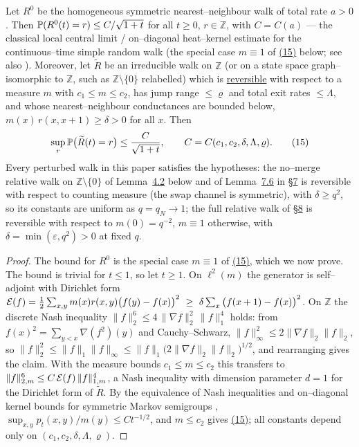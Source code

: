 \documentclass[11pt]{article}
\theoremstyle{plain}
\theoremstyle{definition}
\theoremstyle{remark}
\newcommand{\Z}{\mathbb{Z}}\newcommand{\R}{\mathbb{R}}\newcommand{\N}{\mathbb{N}}
\newcommand{\eps}{\varepsilon}\newcommand{\Exp}{\mathrm{Exp}}
\begin{document}
Let $R^0$ be the homogeneous symmetric nearest--neighbour walk of total rate $a>0$.
Then $\mathbb{P}(R^0(t)=r)\le C/\sqrt{1+t}$ for all $t\ge0$, $r\in\Z$, with $C=C(a)$ --- the
classical local central limit / on--diagonal heat--kernel estimate for the
continuous--time simple random walk (the special case $m\equiv1$ of \hyperref[eq_tildeR]{(15)}
below; see also \cite{LawlerLimic}).
Moreover, let $\widetilde R$ be an irreducible walk on $\Z$ (or on a state space
graph--isomorphic to $\Z$, such as $\Z\setminus\{0\}$ relabelled) which is
\underline{reversible} with respect to a measure $m$ with $c_1\le m\le c_2$, has jump range
$\le\varrho$ and total exit rates $\le\Lambda$, and whose nearest--neighbour
conductances are bounded below, $m(x)\,r(x,x+1)\ge\delta>0$ for all $x$. Then
\label{eq_tildeR}
\begin{equation}
  \sup_{r}\mathbb{P}\big(\widetilde R(t)=r\big)\le \frac{C}{\sqrt{1+t}},
  \qquad C=C(c_1,c_2,\delta,\Lambda,\varrho).\qquad(15)
\end{equation}
Every perturbed walk in this paper satisfies the hypotheses: the no--merge relative
walk on $\Z\setminus\{0\}$ of Lemma~\hyperref[lem_Rlclt]{4.2} below and of Lemma~\hyperref[lem_occ]{7.6} in \S\hyperref[sec_cross]{7} is reversible
with respect to counting measure (the swap channel is symmetric), with $\delta\ge
q^2$, so its constants are uniform as $q=q_N\to1$; the full relative walk of
\S\hyperref[sec_tw]{8} is reversible with respect to $m(0)=q^{-2}$, $m\equiv1$ otherwise, with
$\delta=\min(\eps,q^2)>0$ at fixed $q$.
\par
\begin{proof}
The bound for $R^0$ is the special case $m\equiv1$ of \hyperref[eq_tildeR]{(15)}, which we now
prove. The bound is trivial for $t\le1$, so let $t\ge1$. On $\ell^2(m)$
the generator is self--adjoint with Dirichlet form
$\mathcal E(f)=\tfrac12\sum_{x,y}m(x)r(x,y)\big(f(y)-f(x)\big)^2
\ \ge\ \delta\sum_x\big(f(x+1)-f(x)\big)^2$. On $\Z$ the discrete Nash inequality
$\|f\|_2^6\le4\,\|\nabla f\|_2^2\,\|f\|_1^4$ holds: from
$f(x)^2=\sum_{y<x}\nabla(f^2)(y)$ and Cauchy--Schwarz,
$\|f\|_\infty^2\le2\|\nabla f\|_2\|f\|_2$, so
$\|f\|_2^2\le\|f\|_1\|f\|_\infty\le\|f\|_1\big(2\|\nabla f\|_2\|f\|_2\big)^{1/2}$,
and rearranging gives the claim. With the measure bounds $c_1\le m\le c_2$ this
transfers to $\|f\|_{2,m}^6\le C\,\mathcal E(f)\,\|f\|_{1,m}^4$, a Nash inequality with
dimension parameter $d=1$ for the Dirichlet form of $\widetilde R$. By the
equivalence of Nash inequalities and on--diagonal kernel bounds for symmetric Markov
semigroups \cite{CKS}, $\sup_{x,y}p_t(x,y)/m(y)\le Ct^{-1/2}$, and $m\le c_2$ gives
\hyperref[eq_tildeR]{(15)}; all constants depend only on $(c_1,c_2,\delta,\Lambda,\varrho)$.
\end{proof}
\end{document}
